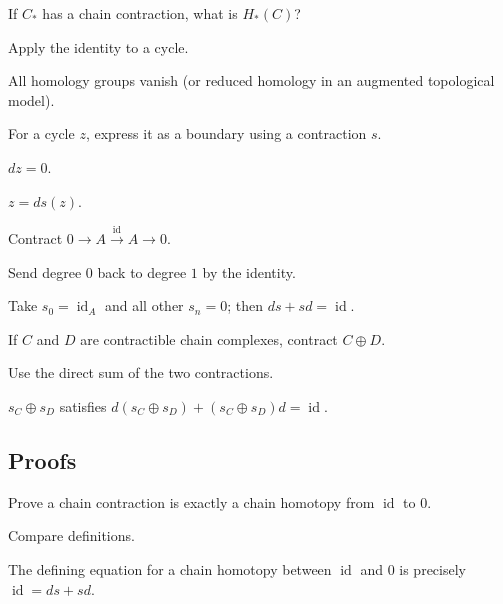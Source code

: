 \begin{exercise}\label{exr:viii23-ped-02}
If $C_*$ has a chain contraction, what is $H_*(C)$?
\end{exercise}
\begin{hint}
Apply the identity to a cycle.
\end{hint}
\begin{solution}
All homology groups vanish (or reduced homology in an augmented topological model).
\end{solution}

\begin{exercise}\label{exr:viii23-ped-03}
For a cycle $z$, express it as a boundary using a contraction $s$.
\end{exercise}
\begin{hint}
$dz=0$.
\end{hint}
\begin{solution}
$z=ds(z)$.
\end{solution}

\begin{exercise}\label{exr:viii23-ped-04}
Contract $0\to A\xrightarrow{\mathrm{id}}A\to0$.
\end{exercise}
\begin{hint}
Send degree $0$ back to degree $1$ by the identity.
\end{hint}
\begin{solution}
Take $s_0=\operatorname{id}_A$ and all other $s_n=0$; then $ds+sd=\operatorname{id}$.
\end{solution}

\begin{exercise}\label{exr:viii23-ped-05}
If $C$ and $D$ are contractible chain complexes, contract $C\oplus D$.
\end{exercise}
\begin{hint}
Use the direct sum of the two contractions.
\end{hint}
\begin{solution}
$s_C\oplus s_D$ satisfies $d(s_C\oplus s_D)+(s_C\oplus s_D)d=\operatorname{id}$.
\end{solution}

\subsection*{Proofs}

\begin{exercise}\label{exr:viii23-ped-06}
Prove a chain contraction is exactly a chain homotopy from $\operatorname{id}$ to $0$.
\end{exercise}
\begin{hint}
Compare definitions.
\end{hint}
\begin{solution}
The defining equation for a chain homotopy between $\operatorname{id}$ and $0$ is precisely $\operatorname{id}=ds+sd$.
\end{solution}

